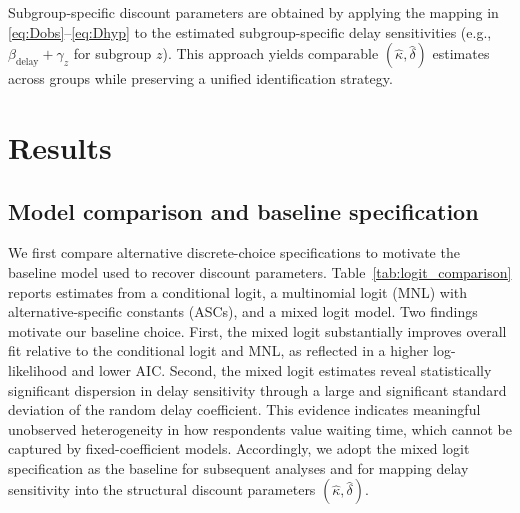\documentclass[doublespacing]{utdthesis}
\begin{document}
Subgroup-specific discount parameters are obtained by applying the mapping in \eqref{eq:Dobs}--\eqref{eq:Dhyp} to the estimated subgroup-specific delay sensitivities (e.g., $\beta_{\text{delay}}+\gamma_z$ for subgroup $z$). This approach yields comparable $(\hat{\kappa},\hat{\delta})$ estimates across groups while preserving a unified identification strategy.


\section{Results}
\label{sec:essay1_results}


\subsection{Model comparison and baseline specification}
\label{subsec:model_comparison}

We first compare alternative discrete-choice specifications to motivate the baseline model used to recover discount parameters. Table~\ref{tab:logit_comparison} reports estimates from a conditional logit, a multinomial logit (MNL) with alternative-specific constants (ASCs), and a mixed logit model. Two findings motivate our baseline choice. First, the mixed logit substantially improves overall fit relative to the conditional logit and MNL, as reflected in a higher log-likelihood and lower AIC. Second, the mixed logit estimates reveal statistically significant dispersion in delay sensitivity through a large and significant standard deviation of the random delay coefficient. This evidence indicates meaningful unobserved heterogeneity in how respondents value waiting time, which cannot be captured by fixed-coefficient models. Accordingly, we adopt the mixed logit specification as the baseline for subsequent analyses and for mapping delay sensitivity into the structural discount parameters $(\hat{\kappa},\hat{\delta})$.
\end{document}
